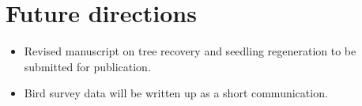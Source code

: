 \documentclass[version=last, paper=a4, DIV=18, usenames, dvipsnames]{scrartcl}
\begin{document}
\section{Future directions}



\begin{itemize}

  \item Revised manuscript on tree recovery and seedling regeneration to be submitted for publication.

  \item Bird survey data will be written up as a short communication.

\end{itemize}






\clearpage
\end{document}
